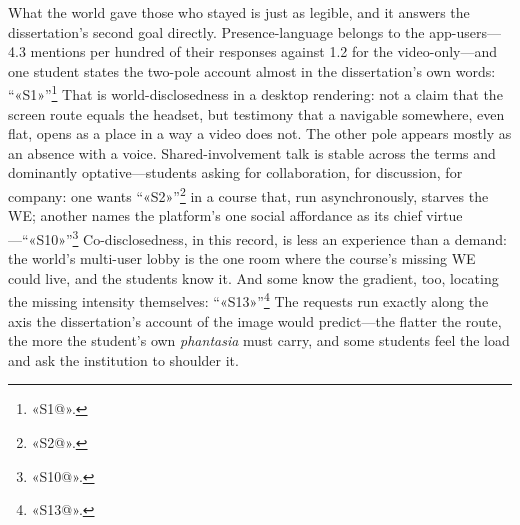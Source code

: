 What the world gave those who stayed is just as legible, and it answers the dissertation's second goal directly. Presence-language belongs to the app-users---4.3 mentions per hundred of their responses against 1.2 for the video-only---and one student states the two-pole account almost in the dissertation's own words: ``«S1»''\footnote{«S1@».} That is world-disclosedness in a desktop rendering: not a claim that the screen route equals the headset, but testimony that a navigable somewhere, even flat, opens as a place in a way a video does not. The other pole appears mostly as an absence with a voice. Shared-involvement talk is stable across the terms and dominantly optative---students asking for collaboration, for discussion, for company: one wants ``«S2»''\footnote{«S2@».} in a course that, run asynchronously, starves the WE; another names the platform's one social affordance as its chief virtue---``«S10»''\footnote{«S10@».} Co-disclosedness, in this record, is less an experience than a demand: the world's multi-user lobby is the one room where the course's missing WE could live, and the students know it. And some know the gradient, too, locating the missing intensity themselves: ``«S13»''\footnote{«S13@».} The requests run exactly along the axis the dissertation's account of the image would predict---the flatter the route, the more the student's own \textit{phantasia} must carry, and some students feel the load and ask the institution to shoulder it.

